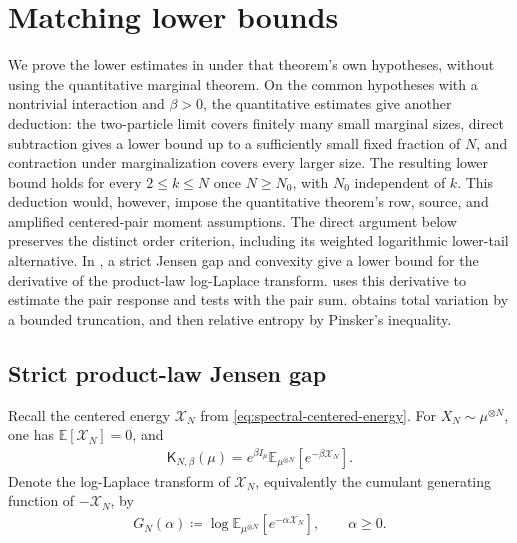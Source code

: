 \documentclass[11pt,reqno]{amsart}
\numberwithin{equation}{section}
\theoremstyle{plain}
\theoremstyle{remark}
\newcommand{\E}{{\mathbb{E}}}
\newcommand{\K}{{\mathsf{K}}}
\newcommand{\XN}{X_N}
\newcommand{\be}{\beta}
\begin{document}
\section{Matching lower bounds}
\label{sec:chi2-tv-lower-bound-proof}

We prove the lower estimates in  under that theorem's own hypotheses, without using the quantitative marginal theorem.  On the common hypotheses with a nontrivial interaction and $\be>0$, the quantitative estimates give another deduction: the two-particle limit covers finitely many small marginal sizes, direct subtraction gives a lower bound up to a sufficiently small fixed fraction of $N$, and contraction under marginalization covers every larger size.  The resulting lower bound holds for every $2\leq k\leq N$ once $N\geq N_0$, with $N_0$ independent of $k$.  This deduction would, however, impose the quantitative theorem's row, source, and amplified centered-pair moment assumptions.  The direct argument below preserves the distinct order criterion, including its weighted logarithmic lower-tail alternative.  In , a strict Jensen gap and convexity give a lower bound for the derivative of the product-law log-Laplace transform.   uses this derivative to estimate the pair response and tests with the pair sum.   obtains total variation by a bounded truncation, and then relative entropy by Pinsker's inequality.

\subsection{Strict product-law Jensen gap}
\label{sec:strict-product-law-jensen-gap}

Recall the centered energy $\mathcal X_N$ from \eqref{eq:spectral-centered-energy}.
For \(\XN\sim\mu^{\otimes N}\), one has \(\E\left[\mathcal X_N\right]=0\), and
\begin{align}\label{eq:KN-GN}
 \K_{N,\be}(\mu)
 =e^{\be I_\mu}\E_{\mu^{\otimes N}}\left[e^{-\be \mathcal X_N}\right].
\end{align}
Denote the log-Laplace transform of \(\mathcal X_N\), equivalently the cumulant generating function of \(-\mathcal X_N\), by
\begin{align}\label{eq:GN-def}
 G_N(\alpha)\coloneqq \log \E_{\mu^{\otimes N}}\left[e^{-\alpha \mathcal X_N}\right],
 \qquad \alpha\ge0.
\end{align}
\end{document}
